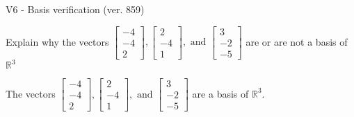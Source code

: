 \begin{exercise}
  \begin{exerciseTitle}V6 - Basis verification (ver. 859)\end{exerciseTitle}
  \begin{exerciseStatement}
    Explain why the vectors \(\left[\begin{array}{r}
-4 \\
-4 \\
2
\end{array}\right] , \left[\begin{array}{r}
2 \\
-4 \\
1
\end{array}\right] , \text{ and } \left[\begin{array}{r}
3 \\
-2 \\
-5
\end{array}\right]\) are or are not a basis of \(\mathbb{R}^3\)	


  \end{exerciseStatement}
  \begin{exerciseAnswer}
   The vectors \(\left[\begin{array}{r}
-4 \\
-4 \\
2
\end{array}\right] , \left[\begin{array}{r}
2 \\
-4 \\
1
\end{array}\right] , \text{ and } \left[\begin{array}{r}
3 \\
-2 \\
-5
\end{array}\right]\) 
  	 are  a basis of \(\mathbb{R}^3\).
  


  \end{exerciseAnswer}
\end{exercise}